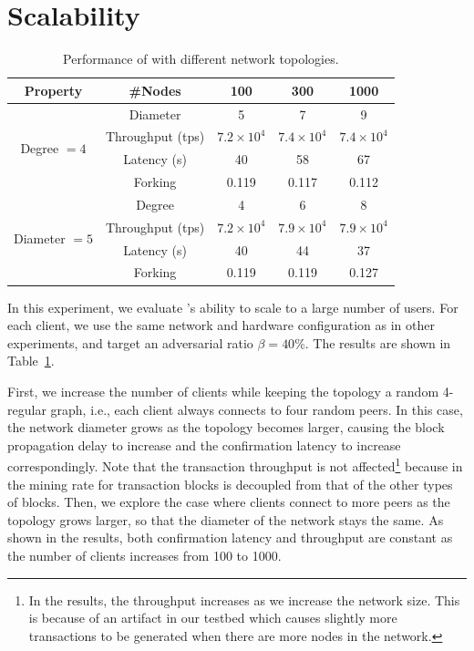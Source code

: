 
\section{Scalability}

\label{sec:eval-scale}
\begin{table}[ht]
	\centering
	\caption{Performance of \prism with different network topologies.}
	\begin{tabular}{| c || c | c c c |} 
	 \hline
	 Property & \#Nodes & 100 & 300 & 1000 \\ [0.5ex] 
	 \hline\hline
	 \multirow{4}{*}{Degree $=4$}   & Diameter & 5 & 7 & 9 \\
	                                & Throughput (tps) & $7.2\times 10^4$ & $7.4\times 10^4$ & $7.4\times 10^4$ \\
	                                & Latency (s) & 40 & 58 & 67 \\
	                                & Forking & 0.119 & 0.117 & 0.112 \\
	 \hline
	 \multirow{4}{*}{Diameter $=5$} & Degree & 4 & 6 & 8 \\
	                                & Throughput (tps) & $7.2\times 10^4$ & $7.9\times 10^4$ & $7.9\times 10^4$ \\ 
	                                & Latency (s) &40 & 44 & 37 \\
	                                & Forking & 0.119 & 0.119 & 0.127 \\
	 \hline
	\end{tabular}
	\label{table:scale}
	\end{table}

In this experiment, we evaluate \prism's ability to scale to a large number of users. For each client, we use the same network and hardware configuration as in other experiments, and target an adversarial ratio $\beta=40\%$. The results are shown in Table~\ref{table:scale}.

First, we increase the number of clients while keeping the topology a random 4-regular graph, i.e., each client always connects to four random peers. In this case, the network diameter grows as the topology becomes larger, causing the block propagation delay to increase and the confirmation latency to increase correspondingly. Note that the transaction throughput is not affected\footnote{In the results, the throughput increases as we increase the network size. This is because of an artifact in our testbed which causes slightly more transactions to be generated when there are more nodes in the network.} because in \prism the mining rate for transaction blocks is decoupled from that of the other types of blocks. Then, we explore the case where clients connect to more peers as the topology grows larger, so that the diameter of the network stays the same. As shown in the results, both confirmation latency and throughput are constant as the number of clients increases from 100 to 1000. 


